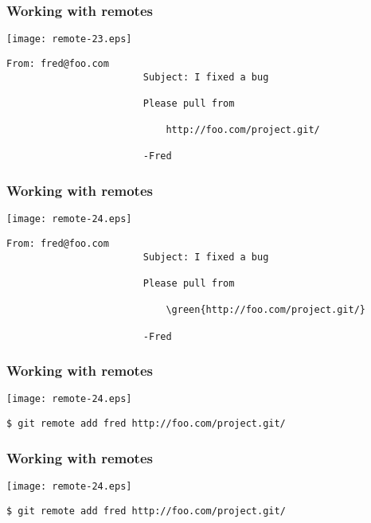 \documentclass[english]{beamer}
\newcommand{\CMD}[1]{%
\texttt{\textcolor{code-blue}{#1}}%
}
\newcommand{\green}[1]{%
\textcolor{code-green}{#1}%
}
\newcommand{\red}[1]{%
\textcolor{code-red}{#1}%
}
\begin{document}
\begin{frame}[fragile]
\frametitle{Working with remotes}

\texttt{[image: remote-23.eps]}

{\tiny
\begin{Verbatim}[commandchars=\\\{\}]
                        From: fred@foo.com
                        Subject: I fixed a bug

                        Please pull from

                            http://foo.com/project.git/

                        -Fred
\end{Verbatim}
}
\vspace{\textheight}
\end{frame}

\begin{frame}[fragile]
\frametitle{Working with remotes}

\texttt{[image: remote-24.eps]}

{\tiny
\begin{Verbatim}[commandchars=\\\{\}]
                        From: fred@foo.com
                        Subject: I fixed a bug

                        Please pull from

                            \green{http://foo.com/project.git/}

                        -Fred
\end{Verbatim}
}
\vspace{\textheight}
\end{frame}

\begin{frame}[fragile]
\frametitle{Working with remotes}

\texttt{[image: remote-24.eps]}

\CMD{\$ git remote add fred http://foo.com/project.git/}
\vspace{\textheight}
\end{frame}

\begin{frame}[fragile]
\frametitle{Working with remotes}

\texttt{[image: remote-24.eps]}

\CMD{\$ git remote add \red{fred} http://foo.com/project.git/}
\vspace{\textheight}
\end{frame}
\end{document}
